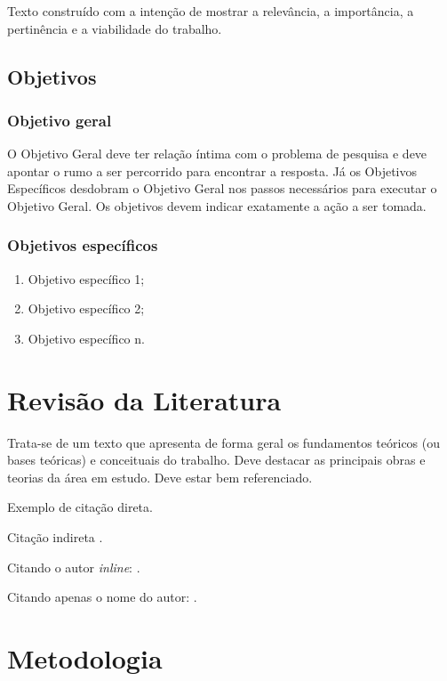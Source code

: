 \documentclass{ifto-tex}
\begin{document}
		Texto construído com a intenção de mostrar	a relevância, a importância, a pertinência e a viabilidade do trabalho.
	
	\section{Objetivos}
	
		\subsection{Objetivo geral}
		
			O Objetivo Geral deve ter relação íntima com o problema de	pesquisa e deve apontar o rumo a ser percorrido para encontrar a resposta. Já os	Objetivos Específicos desdobram o Objetivo Geral nos passos necessários para executar o	Objetivo Geral. Os objetivos devem indicar	exatamente a ação a ser tomada.
		
		\subsection{Objetivos específicos}
		
			\begin{enumerate}
				\item Objetivo específico 1;
				\item Objetivo específico 2;
				\item Objetivo específico n.
			\end{enumerate}

\chapter{Revisão da Literatura}
	
	Trata-se de um texto que apresenta de forma	geral os fundamentos teóricos (ou bases	teóricas) e conceituais do trabalho. Deve destacar as principais obras e teorias da área em estudo. Deve estar bem referenciado.
	
	\begin{citacao}
		Exemplo de citação direta. \cite{Brandao2016}
	\end{citacao}
	
	Citação indireta \cite{Brandao2016}.
	
	Citando o autor \textit{inline}: .
	
	Citando apenas o nome do autor: .
	
\chapter{Metodologia}
	
\end{document}
